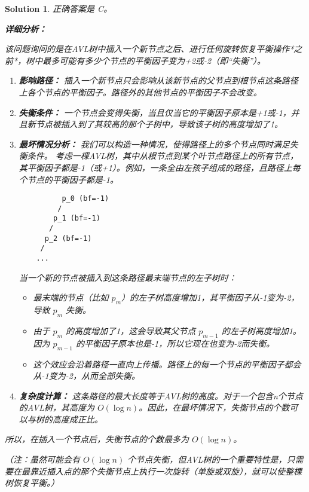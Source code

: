 \documentclass[UTF8]{report}
\newtheorem{solution}{Solution}
\theoremstyle{MyLineTheoremStyle} %
\theoremstyle{MyBlockTheoremStyle} %
\theoremstyle{MySubsubsectionStyle} %
\begin{document}
\begin{solution}
正确答案是 C。

\textbf{详细分析：}

该问题询问的是在AVL树中插入一个新节点之后、进行任何旋转恢复平衡操作*之前*，树中最多可能有多少个节点的平衡因子变为+2或-2（即“失衡”）。

\begin{enumerate}
    \item \textbf{影响路径：} 插入一个新节点只会影响从该新节点的父节点到根节点这条路径上各个节点的平衡因子。路径外的其他节点的平衡因子不会改变。

    \item \textbf{失衡条件：} 一个节点会变得失衡，当且仅当它的平衡因子原本是+1或-1，并且新节点被插入到了其较高的那个子树中，导致该子树的高度增加了1。

    \item \textbf{最坏情况分析：} 我们可以构造一种情况，使得路径上的多个节点同时满足失衡条件。
    考虑一棵AVL树，其中从根节点到某个叶节点路径上的所有节点，其平衡因子都是-1（或+1）。例如，一条全由左孩子组成的路径，且路径上每个节点的平衡因子都是-1。
    \begin{verbatim}
          p_0 (bf=-1)
         /
        p_1 (bf=-1)
       /
      p_2 (bf=-1)
     /
    ...
    \end{verbatim}
    当一个新的节点被插入到这条路径最末端节点的左子树时：
    \begin{itemize}
        \item 最末端的节点（比如 $p_m$）的左子树高度增加1，其平衡因子从-1变为-2，导致 $p_m$ 失衡。
        \item 由于 $p_m$ 的高度增加了1，这会导致其父节点 $p_{m-1}$ 的左子树高度增加1。因为 $p_{m-1}$ 的平衡因子原本也是-1，所以它现在也变为-2而失衡。
        \item 这个效应会沿着路径一直向上传播。路径上的每一个节点的平衡因子都会从-1变为-2，从而全部失衡。
    \end{itemize}

    \item \textbf{复杂度计算：} 这条路径的最大长度等于AVL树的高度。对于一个包含n个节点的AVL树，其高度为 $O(\log n)$。因此，在最坏情况下，失衡节点的个数可以与树的高度成正比。
\end{enumerate}

所以，在插入一个节点后，失衡节点的个数最多为 $O(\log n)$。

（注：虽然可能会有 $O(\log n)$ 个节点失衡，但AVL树的一个重要特性是，只需要在最靠近插入点的那个失衡节点上执行一次旋转（单旋或双旋），就可以使整棵树恢复平衡。）
\end{solution}
\end{document}
